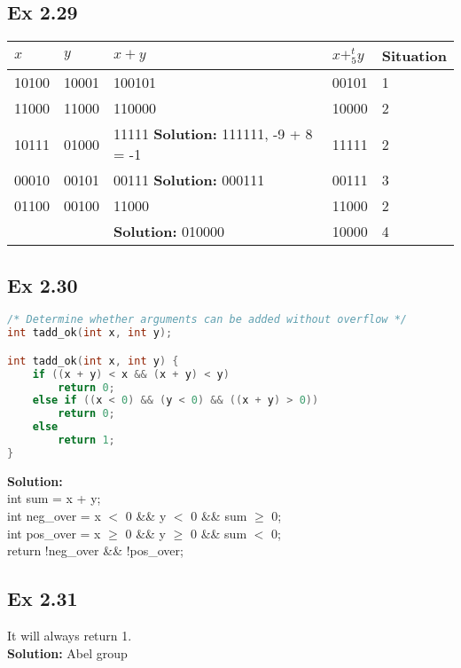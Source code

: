 \subsection{Ex 2.29}
\begin{table}[h]
    \centering
    \begin{tabular}{lllll}
        \toprule
        $x$ & $y$ & $x + y$ & $x +^t_5 y$ & Situation\\
        \midrule
        10100 & 10001 & 100101 & 00101 & 1\\
        11000 & 11000 & 110000 & 10000 & 2\\
        10111 & 01000 & 11111 {\color{red}\textbf{Solution: }111111, -9 + 8 = -1} & 11111 & 2\\
        00010 & 00101 & 00111 {\color{red}\textbf{Solution: }000111}& 00111 & 3\\
        01100 & 00100 & 11000 & 11000 & 2\\
              &&{\color{red}\textbf{Solution: }010000} & {\color{red}10000} & {\color{red}4} \\
        \bottomrule
    \end{tabular}
\end{table}

\subsection{Ex 2.30}
\begin{lstlisting}[language=C]
/* Determine whether arguments can be added without overflow */
int tadd_ok(int x, int y);

int tadd_ok(int x, int y) {
    if ((x + y) < x && (x + y) < y)
        return 0;
    else if ((x < 0) && (y < 0) && ((x + y) > 0))
        return 0;
    else
        return 1;
}
\end{lstlisting}
{\color{red}\textbf{Solution: }\\
int sum = x + y;\\
int neg\_over = x $<$ 0 \&\& y $<$ 0 \&\& sum $\geq$ 0;\\
int pos\_over = x $\geq$ 0 \&\& y $\geq$ 0 \&\& sum $<$ 0;\\
return !neg\_over \&\& !pos\_over;
}

\subsection{Ex 2.31}
It will always return 1.\\
{\color{blue}\textbf{Solution: }Abel group}

